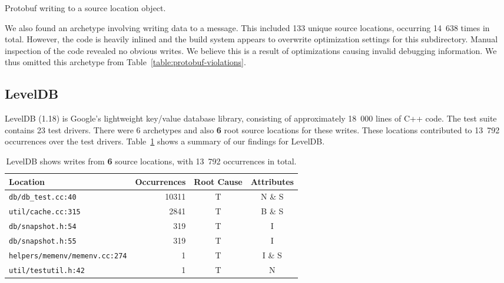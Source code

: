 \begin{listing}[!htb]
  \caption{Protobuf writing to a source location object.}
  \label{listing-protobuf-locations}
  \centering
  
\end{listing}

We also found an archetype involving writing data to a message.
This included 133 unique source locations, occurring 14~638 times in total.
However, the code is heavily inlined and the build system appears to overwrite
optimization settings for this subdirectory.
Manual inspection of the code revealed no obvious writes.
We believe this is a result of optimizations causing invalid debugging
information.
We thus omitted this archetype from Table~\ref{table:protobuf-violations}.

\subsection{LevelDB}

LevelDB (1.18) is Google's lightweight key/value database library, consisting of
approximately 18~000 lines of C++ code.
The test suite contains 23 test drivers.
There were 6 archetypes and also {\bf 6} root source locations for these writes.
These locations contributed to 13~792 occurrences over the test drivers.
Table~\ref{table:leveldb-violations} shows a summary of our findings for
LevelDB.

\begin{table}[!htb]
  \centering
  \caption{LevelDB shows writes from {\bf 6} source locations, with 13~792
           occurrences in total.}
  \label{table:leveldb-violations}
  \begin{tabular}{l  r  c  c }
    \textbf{Location} & \textbf{Occurrences} & \textbf{Root Cause}
    & \textbf{Attributes} \\
    \midrule
    \texttt{db/db\_test.cc:40} & 10311 & T & N \& S \\
    \texttt{util/cache.cc:315} & 2841 & T & B \& S\\
    \texttt{db/snapshot.h:54} & 319 & T & I \\
    \texttt{db/snapshot.h:55} & 319 & T & I \\
    \texttt{helpers/memenv/memenv.cc:274} & 1 & T & I \& S \\
    \texttt{util/testutil.h:42} & 1 & T & N \\
  \end{tabular}
\end{table}

